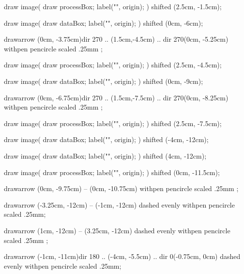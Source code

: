 draw image(
  draw processBox;
  label("", origin);
) shifted (2.5cm, -1.5cm);

draw image(
  draw dataBox;
  label("", origin);
) shifted (0cm, -6cm);

drawarrow (0cm, -3.75cm){dir 270} .. (1.5cm,-4.5cm) .. {dir 270}(0cm, -5.25cm)
  withpen pencircle scaled .25mm ;

draw image(
  draw processBox;
  label("", origin);
) shifted (2.5cm, -4.5cm);

draw image(
  draw dataBox;
  label("", origin);
) shifted (0cm, -9cm);

drawarrow (0cm, -6.75cm){dir 270} .. (1.5cm,-7.5cm) .. {dir 270}(0cm, -8.25cm)
  withpen pencircle scaled .25mm ;

draw image(
  draw processBox;
  label("", origin);
) shifted (2.5cm, -7.5cm);

draw image(
  draw dataBox;
  label("", origin);
) shifted (-4cm, -12cm);

draw image(
  draw dataBox;
  label("", origin);
) shifted (4cm, -12cm);

draw image(
  draw processBox;
  label("", origin);
) shifted (0cm, -11.5cm);

drawarrow (0cm, -9.75cm) -- (0cm, -10.75cm)
  withpen pencircle scaled .25mm ;

drawarrow (-3.25cm, -12cm) -- (-1cm, -12cm)
  dashed evenly
  withpen pencircle scaled .25mm;

drawarrow (1cm, -12cm) -- (3.25cm, -12cm)
  dashed evenly
  withpen pencircle scaled .25mm ;
  
drawarrow (-1cm, -11cm){dir 180} .. (-4cm, -5.5cm) .. {dir 0}(-0.75cm, 0cm)
  dashed evenly
  withpen pencircle scaled .25mm;
\stopMPcode\egroup




